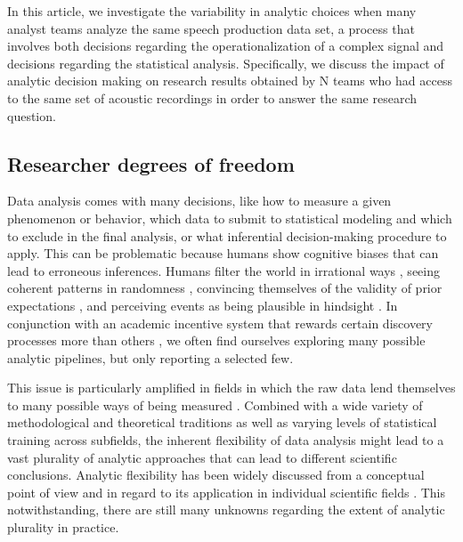\documentclass[Review,times,sageh]{sagej}
\begin{document}
In this article, we investigate the variability in analytic choices when many analyst teams analyze the same speech production data set, a process that involves both decisions regarding the operationalization of a complex signal and decisions regarding the statistical analysis.
Specifically, we discuss the impact of analytic decision making on research results obtained by N teams who had access to the same set of acoustic recordings in order to answer the same research question.

\hypertarget{researcher-degrees-of-freedom}{%
\subsection{Researcher degrees of freedom}\label{researcher-degrees-of-freedom}}

Data analysis comes with many decisions, like how to measure a given phenomenon or behavior, which data to submit to statistical modeling and which to exclude in the final analysis, or what inferential decision-making procedure to apply.
This can be problematic because humans show cognitive biases that can lead to erroneous inferences.
Humans filter the world in irrational ways \citep[e.g.,][]{tversky1974judgment}, seeing coherent patterns in randomness \citep{brugger2001}, convincing themselves of the validity of prior expectations \citep[``I knew it'',][]{nickerson1998confirmation}, and perceiving events as being plausible in hindsight \citep[``I knew it all along'',][]{fischhoff1975hindsight}.
In conjunction with an academic incentive system that rewards certain discovery processes more than others \citep{sterling1959publication, koole2012rewarding}, we often find ourselves exploring many possible analytic pipelines, but only reporting a selected few.

This issue is particularly amplified in fields in which the raw data lend themselves to many possible ways of being measured \citep{roettger2019researcher}.
Combined with a wide variety of methodological and theoretical traditions as well as varying levels of statistical training across subfields, the inherent flexibility of data analysis might lead to a vast plurality of analytic approaches that can lead to different scientific conclusions.
Analytic flexibility has been widely discussed from a conceptual point of view \citep{simmons2011false, wagenmakers2012agenda, nosek2014method} and in regard to its application in individual scientific fields \citep[e.g.][]{wicherts2016, charles2019, roettger2019researcher}.
This notwithstanding, there are still many unknowns regarding the extent of analytic plurality in practice.
\end{document}
